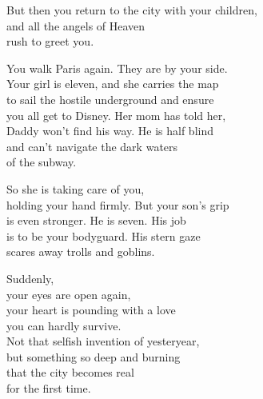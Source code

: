 \documentclass[12pt,twoside]{article}
\newcounter{scounter}
\newcommand\step{\stepcounter{scounter}\Roman{scounter}}
\begin{document}
\poemtitle{\step} 
\begin{poem}
\begin{stanza} 
But then you return to the city with your children,\\
and all the angels of Heaven\\
rush to greet you.
\end{stanza} 
\begin{stanza} 
You walk Paris again. They are by your side.\\
Your girl is eleven, and she carries the map\\
to sail the hostile underground and ensure\\
you all get to Disney. Her mom has told her,\\
Daddy won't find his way. He is half blind\\
and can't navigate the dark waters\\
of the subway.
\end{stanza} 
\begin{stanza} 
So she is taking care of you, \\
holding your hand firmly. But your son's grip\\
is even stronger. He is seven. His job\\
is to be your bodyguard. His stern gaze\\
scares away trolls and goblins. 
\end{stanza}
\begin{stanza} 
Suddenly,\\
your eyes are open again,\\
your heart is pounding with a love\\
you can hardly survive. \\
Not that selfish invention of yesteryear,\\
but something so deep and burning\\
that the city becomes real\\
for the first time.   
\end{stanza} 
\end{poem}
\end{document}
